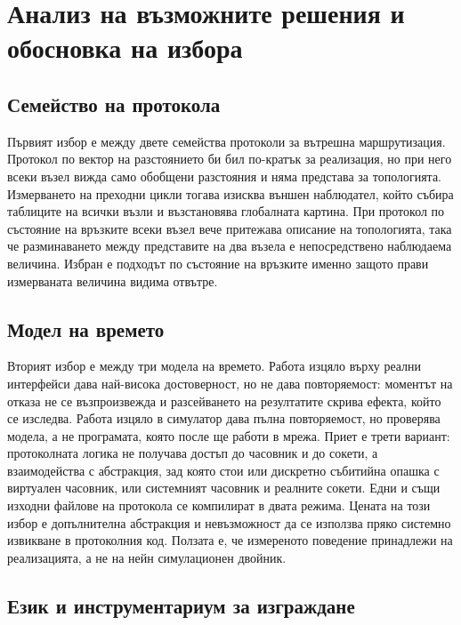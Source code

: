 \section{Анализ на възможните решения и обосновка на избора}
\label{sec:alternatives}

\subsection{Семейство на протокола}

Първият избор е между двете семейства протоколи за вътрешна маршрутизация. Протокол по
вектор на разстоянието би бил по-кратък за реализация, но при него всеки възел вижда
само обобщени разстояния и няма представа за топологията. Измерването на преходни цикли
тогава изисква външен наблюдател, който събира таблиците на всички възли и възстановява
глобалната картина. При протокол по състояние на връзките всеки възел вече притежава
описание на топологията, така че разминаването между представите на два възела е
непосредствено наблюдаема величина. Избран е подходът по състояние на връзките именно
защото прави измерваната величина видима отвътре.

\subsection{Модел на времето}

Вторият избор е между три модела на времето. Работа изцяло върху реални интерфейси дава
най-висока достоверност, но не дава повторяемост: моментът на отказа не се възпроизвежда
и разсейването на резултатите скрива ефекта, който се изследва. Работа изцяло в
симулатор дава пълна повторяемост, но проверява модела, а не програмата, която после ще
работи в мрежа. Приет е трети вариант: протоколната логика не получава достъп до
часовник и до сокети, а взаимодейства с абстракция, зад която стои или дискретно
събитийна опашка с виртуален часовник, или системният часовник и реалните сокети.
Едни и същи изходни файлове на протокола се компилират в двата режима. Цената на този
избор е допълнителна абстракция и невъзможност да се използва пряко системно извикване
в протоколния код. Ползата е, че измереното поведение принадлежи на реализацията, а не
на нейн симулационен двойник.

\subsection{Език и инструментариум за изграждане}

